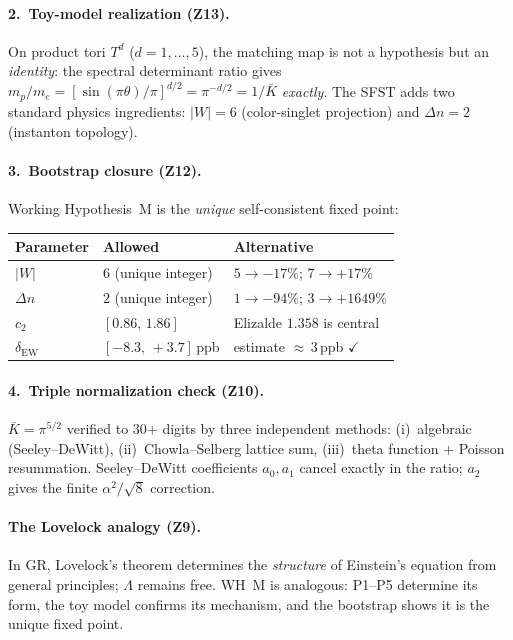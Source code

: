 \documentclass[11pt,a4paper]{article}
\begin{document}
\paragraph{2.\ Toy-model realization (Z13).}
On product tori $T^d$ ($d=1,\ldots,5$), the matching map is not a
hypothesis but an \emph{identity}: the spectral determinant ratio
gives $m_p/m_e = [\sin(\pi\theta)/\pi]^{d/2} = \pi^{-d/2} = 1/\bar K$
\emph{exactly}. The SFST adds two standard physics ingredients:
$|W|=6$ (color-singlet projection) and $\Delta n=2$ (instanton topology).

\paragraph{3.\ Bootstrap closure (Z12).}
Working Hypothesis~M is the \emph{unique} self-consistent fixed point:

\begin{center}
\renewcommand{\arraystretch}{1.1}\small
\begin{tabular}{lll}
\toprule
\textbf{Parameter} & \textbf{Allowed} & \textbf{Alternative}\\
\midrule
$|W|$ & $6$ (unique integer) & $5\to -17\%$; $7\to +17\%$\\
$\Delta n$ & $2$ (unique integer) & $1\to -94\%$; $3\to +1649\%$\\
$c_2$ & $[0.86,\,1.86]$ & Elizalde $1.358$ is central\\
$\delta_{\mathrm{EW}}$ & $[-8.3,\,+3.7]\,$ppb & estimate ${\approx}\,3\,$ppb $\checkmark$\\
\bottomrule
\end{tabular}
\end{center}

\paragraph{4.\ Triple normalization check (Z10).}
$\bar K = \pi^{5/2}$ verified to 30+ digits by three independent methods:
(i)~algebraic (Seeley--DeWitt),
(ii)~Chowla--Selberg lattice sum,
(iii)~theta function $+$ Poisson resummation.
Seeley--DeWitt coefficients $a_0,a_1$ cancel exactly in the ratio;
$a_2$ gives the finite $\alpha^2/\!\sqrt{8}$ correction.

\paragraph{The Lovelock analogy (Z9).}
In GR, Lovelock's theorem determines the \emph{structure} of Einstein's
equation from general principles; $\Lambda$ remains free.
WH~M is analogous: P1--P5 determine its form, the toy model confirms
its mechanism, and the bootstrap shows it is the unique fixed point.
\end{document}

